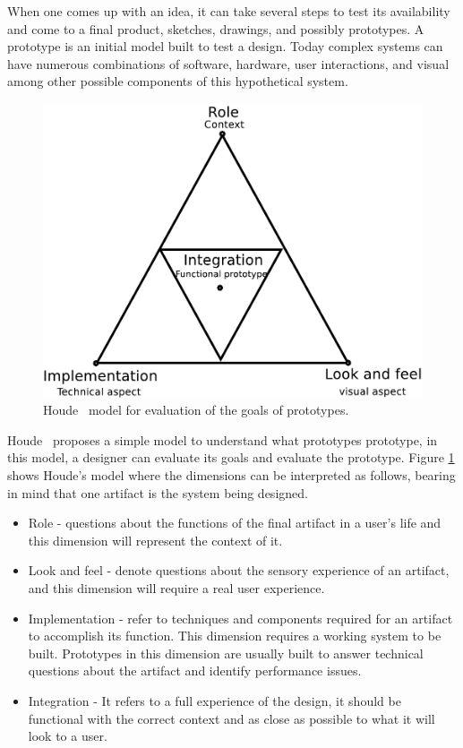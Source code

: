 When one comes up with an idea, it can take several steps to test its availability and come to a final product, sketches, drawings, and possibly prototypes. A prototype is an initial model built to test a design\cite{ScienceEncProt}.
 Today complex systems can have numerous combinations of software, hardware, user interactions, and visual among other possible components of this hypothetical system.  
 
 \begin{figure}[!ht]
	\centering
	\includegraphics[scale=0.52]{figures/pdf/houdemodel.pdf}
	\caption{Houde \etal~model for evaluation of the goals of prototypes.}
	\label{fig:houdemodel}
\end{figure}
Houde \etal~\cite{Houde97whatdo}proposes a simple model to understand what prototypes prototype, in this model, a designer can evaluate its goals and evaluate the prototype.  Figure \ref{fig:houdemodel} shows Houde's model where the dimensions can be interpreted as follows, bearing in mind that one artifact is the system being designed.
\begin{itemize}
    \item Role - questions about the functions of the final artifact in a user's life and this dimension will represent the context of it.
    \item Look and feel - denote questions about the sensory experience of an artifact, and this dimension will require a real user experience.
    \item Implementation -  refer to techniques and components required for an artifact to accomplish its function. This dimension requires a working system to be built. Prototypes in this dimension are usually built to answer technical questions about the artifact and identify performance issues.
    \item Integration - It refers to a full experience of the design, it should be functional with the correct context and as close as possible to what it will look to a user.
\end{itemize}


